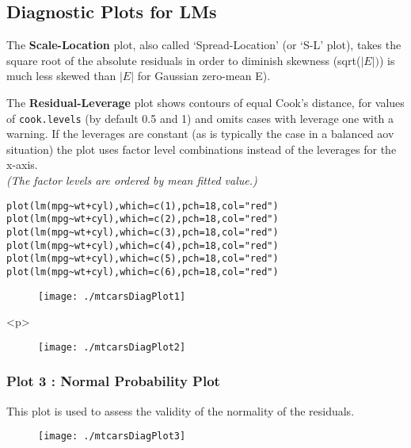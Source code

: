 \documentclass[main.tex]{subfiles}
\begin{document}
\subsection{Diagnostic Plots for LMs}

\item
The \textbf{Scale-Location} plot, also called ‘Spread-Location’ (or ‘S-L’ plot), takes the square root of the absolute residuals in order to diminish skewness (sqrt($|E|)$) is much less skewed than $| E |$ for Gaussian zero-mean E).

\item
The \textbf{Residual-Leverage} plot shows contours of equal Cook's distance, for values of \texttt{cook.levels} (by default 0.5 and 1) and omits cases with leverage one with a warning. If the leverages are constant (as is typically the case in a balanced aov situation) the plot uses factor level combinations instead of the leverages for the x-axis. \\
\textit{(The factor levels are ordered by mean fitted value.)}

\begin{framed}
\begin{verbatim}
plot(lm(mpg~wt+cyl),which=c(1),pch=18,col="red")
plot(lm(mpg~wt+cyl),which=c(2),pch=18,col="red")
plot(lm(mpg~wt+cyl),which=c(3),pch=18,col="red")
plot(lm(mpg~wt+cyl),which=c(4),pch=18,col="red")
plot(lm(mpg~wt+cyl),which=c(5),pch=18,col="red")
plot(lm(mpg~wt+cyl),which=c(6),pch=18,col="red")
\end{verbatim}
\end{framed}

\begin{figure}[h!]
\centering
\texttt{[image: ./mtcarsDiagPlot1]}

\label{mtcarsDiagPlot1}
\end{figure}

<p>
\begin{figure}[h!]
\centering
\texttt{[image: ./mtcarsDiagPlot2]}

\label{mtcarsDiagPlot2}
\end{figure}

\subsubsection{Plot 3 : Normal Probability Plot}
This plot is used to assess the validity of the normality of the residuals.
\begin{figure}[h!]
\centering
\texttt{[image: ./mtcarsDiagPlot3]}

\label{mtcarsDiagPlot3}
\end{figure}
\end{document}
